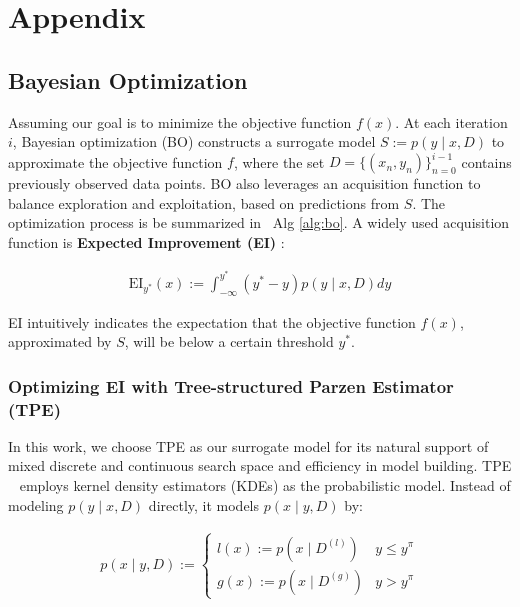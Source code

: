 

\appendix
\section{Appendix}



\subsection{Bayesian Optimization}


Assuming our goal is to minimize the objective function $f(x)$. At each iteration $i$, Bayesian optimization (BO) constructs a surrogate model $S := p(y \mid x, D)$ to approximate the objective function $f$, where the set $D = \{(x_n,y_n)\}^{i-1}_{n=0}$ contains previously observed data points. BO also leverages an acquisition function to balance exploration and exploitation, based on predictions from $S$. The optimization process is be summarized in ~Alg \ref{alg:bo}. A widely used acquisition function is \textbf{Expected Improvement (EI)} \cite{Jones1998EfficientGO}:

\begin{align*}
    \text{EI}_{y^*}(x) := \int_{-\infty}^{y^*}(y^* - y)p(y\mid x, D)dy
\end{align*}

EI intuitively indicates the expectation that the objective function $f(x)$, approximated by $S$, will be below a certain threshold $y^*$.

\subsubsection{Optimizing EI with Tree-structured Parzen Estimator (TPE)}
\label{appdx:TPE}
In this work, we choose TPE as our surrogate model for its natural support of mixed discrete and continuous search space and efficiency in model building. TPE ~\cite{NIPS2011_TPE} employs kernel density estimators (KDEs) as the probabilistic model. Instead of modeling $p(y\mid x, D)$ directly, it models $p(x\mid y, D)$ by:

\begin{align*}
    p(x\mid y, D) := \begin{cases}
      l(x) := p(x\mid D^{(l)}) & y \leq y^{\pi}\\
      g(x) := p(x\mid D^{(g)}) & y > y^{\pi}
    \end{cases}       
\end{align*}

